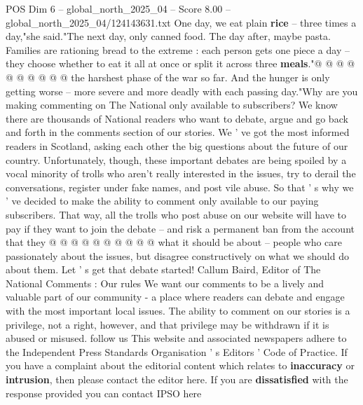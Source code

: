 \begin{textsample}{POS Dim 6 – global\_north\_2025\_04 – Score 8.00 – global\_north\_2025\_04/124143631.txt}
One day, we eat plain \textbf{rice} -- three times a day,"she said."The next day, only canned food.
The day after, maybe pasta.
Families are rationing bread to the extreme : each person gets one piece a day -- they choose whether to eat it all at once or split it across three \textbf{meals}."@ @ @ @ @ @ @ @ @ @ the harshest phase of the war so far.
And the hunger is only getting worse -- more severe and more deadly with each passing day."Why are you making commenting on The National only available to subscribers?
We know there are thousands of National readers who want to debate, argue and go back and forth in the comments section of our stories.
We ' ve got the most informed readers in Scotland, asking each other the big questions about the future of our country.
Unfortunately, though, these important debates are being spoiled by a vocal minority of trolls who aren't really interested in the issues, try to derail the conversations, register under fake names, and post vile abuse.
So that ' s why we ' ve decided to make the ability to comment only available to our paying subscribers.
That way, all the trolls who post abuse on our website will have to pay if they want to join the debate -- and risk a permanent ban from the account that they @ @ @ @ @ @ @ @ @ @ what it should be about -- people who care passionately about the issues, but disagree constructively on what we should do about them.
Let ' s get that debate started!
Callum Baird, Editor of The National Comments : Our rules We want our comments to be a lively and valuable part of our community - a place where readers can debate and engage with the most important local issues.
The ability to comment on our stories is a privilege, not a right, however, and that privilege may be withdrawn if it is abused or misused. follow us This website and associated newspapers adhere to the Independent Press Standards Organisation ' s Editors ' Code of Practice.
If you have a complaint about the editorial content which relates to \textbf{inaccuracy} or \textbf{intrusion}, then please contact the editor here.
If you are \textbf{dissatisfied} with the response provided you can contact IPSO here

\end{textsample}
